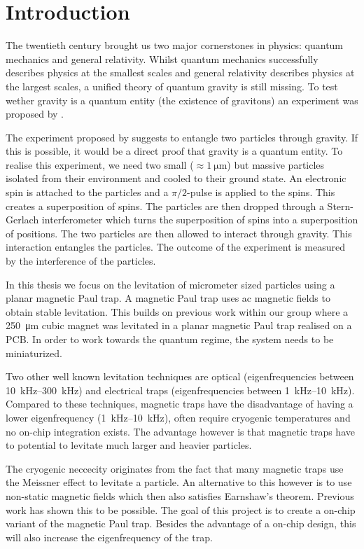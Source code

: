 \chapter{Introduction}
\label{chap:introduction}
The twentieth century brought us two major cornerstones in physics: quantum mechanics and general relativity. Whilst quantum mechanics successfully describes physics at the smallest scales and general relativity describes physics at the largest scales, a unified theory of quantum gravity is still missing. To test wether gravity is a quantum entity (the existence of gravitons) an experiment was proposed by \textcite{bose_spin_2017}.

The experiment proposed by \citeauthor{bose_spin_2017} suggests to entangle two particles through gravity. If this is possible, it would be a direct proof that gravity is a quantum entity. To realise this experiment, we need two small ($\approx \qty{1}{\micro\meter}$) but massive particles isolated from their environment and cooled to their ground state. An electronic spin is attached to the particles and a $\pi/2$-pulse is applied to the spins. This creates a superposition of spins. The particles are then dropped through a Stern-Gerlach interferometer which turns the superposition of spins into a superposition of positions. The two particles are then allowed to interact through gravity. This interaction entangles the particles. The outcome of the experiment is measured by the interference of the particles.

In this thesis we focus on the levitation of micrometer sized particles using a planar magnetic Paul trap. A magnetic Paul trap uses ac magnetic fields to obtain stable levitation. This builds on previous work within our group where a \qty{250}{\micro\meter} cubic  magnet was levitated in a planar magnetic Paul trap realised on a PCB\cite{eli, mart}. In order to work towards the quantum regime, the system needs to be miniaturized.

Two other well known levitation techniques are optical (eigenfrequencies between \qtyrange{10}{300}{\kilo\hertz}) and electrical traps (eigenfrequencies between \qtyrange{1}{10}{\kilo\hertz})\cite{levitodynamics}. Compared to these techniques, magnetic traps have the disadvantage of having a lower eigenfrequency (\qtyrange{1}{10}{\kilo\hertz}), often require cryogenic temperatures and no on-chip integration exists\cite{levitodynamics}. The advantage however is that magnetic traps have to potential to levitate much larger and heavier particles.

The cryogenic neccecity originates from the fact that many magnetic traps use the Meissner effect to levitate a particle. An alternative to this however is to use non-static magnetic fields which then also satisfies Earnshaw's theorem. Previous work has shown this to be possible\cite{perdriat,eli,mart}. The goal of this project is to create a on-chip variant of the magnetic Paul trap. Besides the advantage of a on-chip design, this will also increase the eigenfrequency of the trap\cite{perdriat}.
